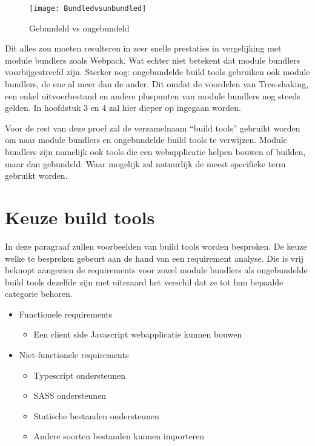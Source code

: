 \begin{figure}[h]
\texttt{[image: Bundledvsunbundled]}
   \caption{Gebundeld vs ongebundeld \autocite{snowpack-no-date}}
\end{figure}

Dit alles zou moeten resulteren in zeer snelle prestaties in vergelijking met module bundlers zoals Webpack. Wat echter niet betekent dat module bundlers voorbijgestreefd zijn. Sterker nog: ongebundelde build tools gebruiken ook module bundlers, de ene al meer dan de ander. Dit omdat de voordelen van Tree-shaking, een enkel uitvoerbestand en andere pluspunten van module bundlers nog steeds gelden. In hoofdstuk 3 en 4 zal hier dieper op ingegaan worden.

Voor de rest van deze proef zal de verzamelnaam “build tools” gebruikt worden om naar module bundlers en ongebundelde build tools te verwijzen. Module bundlers zijn namelijk ook tools die een webapplicatie helpen bouwen of builden, maar dan gebundeld. Waar mogelijk zal natuurlijk de meest specifieke term gebruikt worden.

\section{Keuze build tools}

In deze paragraaf zullen voorbeelden van build tools worden besproken. De keuze welke te bespreken gebeurt aan de hand van een requirement analyse. Die is vrij beknopt aangezien de requirements voor zowel module bundlers als ongebundelde build tools dezelfde zijn met uiteraard het verschil dat ze tot hun bepaalde categorie behoren.

\begin{itemize}
   \item Functionele requirements
   \begin{itemize}
     \item Een client side \gls{Javascript} webapplicatie kunnen bouwen
   \end{itemize}
   \item Niet-functionele requirements
   \begin{itemize}
     \item Typescript ondersteunen
     \item \gls{SASS} ondersteunen
     \item Statische bestanden ondersteunen
     \item Andere soorten bestanden kunnen importeren
   \end{itemize}
\end{itemize}

